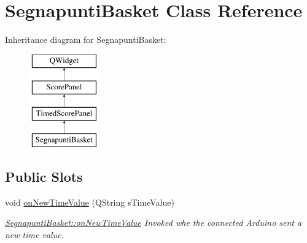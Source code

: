 \hypertarget{classSegnapuntiBasket}{}\section{Segnapunti\+Basket Class Reference}
\label{classSegnapuntiBasket}
Inheritance diagram for Segnapunti\+Basket\+:\begin{figure}[H]
\begin{center}
\leavevmode
\includegraphics[height=4.000000cm]{d3/d5b/classSegnapuntiBasket}
\end{center}
\end{figure}
\subsection*{Public Slots}
\begin{DoxyCompactItemize}
\item 
void \mbox{\hyperlink{classSegnapuntiBasket_a75e9d6be889a2c822e0aa3f13bc342a2}{on\+New\+Time\+Value}} (Q\+String s\+Time\+Value)
\begin{DoxyCompactList}\small\item\em \mbox{\hyperlink{classSegnapuntiBasket_a75e9d6be889a2c822e0aa3f13bc342a2}{Segnapunti\+Basket\+::on\+New\+Time\+Value}} Invoked whe the connected Arduino sent a new time value. \end{DoxyCompactList}\end{DoxyCompactItemize}
